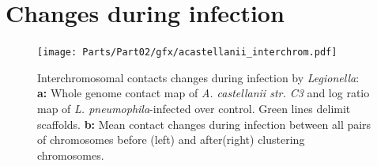 \section{Changes during infection}

\begin{figure}[b]
    \texttt{[image: Parts/Part02/gfx/acastellanii\_interchrom.pdf]}
    \caption{Interchromosomal contacts changes during infection by \textit{Legionella}: \textbf{a:} Whole genome contact map of \textit{A. castellanii str. C3} and log ratio map of \textit{L. pneumophila}-infected over control. Green lines delimit scaffolds. \textbf{b:} Mean contact changes during infection between all pairs of chromosomes before (left) and after(right) clustering chromosomes.}
	\label{fig:02-02:inter-infection}
\end{figure}


